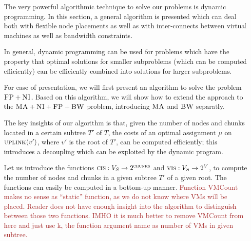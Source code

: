 \documentclass[9pt,twocolumn]{scrartcl}
\newcommand{\maciek}[1]{\textcolor{brown}{#1}}
\newcommand{\VmChunkAssignment}{\mu}
\newcommand{\ChunkLocation}{\pi}
\newcommand{\VirtualNodes}{\ensuremath{V}}
\newcommand{\SubstrateNodes}{\ensuremath{V_S}}
\newcommand{\SubstrateNode}{\ensuremath{v}}
\newcommand{\Leaf}{\ensuremath{l}}
\newcommand{\Leaves}{\ensuremath{L}}
\newcommand{\Chunks}{\ensuremath{\textsc{chunks}}}
\newcommand{\Children}{\ensuremath{children}}
\newcommand{\Uplink}{\ensuremath{\textsc{uplink}}}
\newcommand{\ChunkCount}{\ensuremath{\textsc{cis}}}
\newcommand{\VmCount}{\ensuremath{\textsc{vis}}}
\newcommand{\achunk}{\ensuremath{c}}
\newcommand{\CC}{\textsc{NI}}
\newcommand{\FP}{\textsc{FP}}
\newcommand{\BW}{\textsc{BW}}
\newcommand{\MA}{\textsc{MA}}
\newcommand{\Tree}{\ensuremath{T}}
\begin{document}
The very powerful algorithmic technique to solve our problems
is dynamic programming. In this section, a general algorithm
is presented which can deal both with flexible node placements
as well as with inter-connects between virtual machines as well
as bandwidth constraints. 

In general, dynamic programming can be used for problems which have
the property that optimal solutions for smaller subproblems (which can be computed efficiently)
can be efficiently combined into solutions for larger subproblems.

For ease of presentation, we will first present an algorithm to solve
the problem $\FP+\CC$. Based on this algorithm, we will show how to extend
the approach to the $\MA+\CC+\FP+\BW$ problem, introducing $\MA$ and $\BW$ separatly.


The key insights of our algorithm is that, given the
number of nodes and chunks located in a certain  subtree $\Tree'$ of $\Tree$, the
costs of an optimal assignment $\VmChunkAssignment$ on
$\Uplink(\SubstrateNode')$, where $\SubstrateNode'$ is the root of $\Tree'$,
can be computed efficiently; this introduces a decoupling which can be exploited by the
dynamic program.

Let us introduce the 
functions $\ChunkCount : \SubstrateNodes
\rightarrow
2^\Chunks$ 
and $\VmCount : \SubstrateNodes \rightarrow 2^{\VirtualNodes}$, 
to compute the number of nodes and chunks in a given subtree $\Tree'$
of a given root. The functions can 
easily be computed in a
bottom-up manner. \maciek{Function VMCount makes no sense as ``static'' function, as we do not know where VMs will be placed. Reader does not have enough insight into the algorithm to distinguish between those two functions. IMHO it is much better to remove VMCount from here and just use k, the function argument name as number of VMs in given subtree.}

\end{document}
